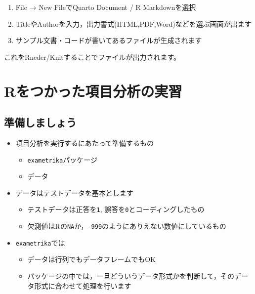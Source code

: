 \documentclass[
  a4paper,
]{ltjsbook}
\providecommand{\tightlist}{%
  \setlength{\itemsep}{0pt}\setlength{\parskip}{0pt}}\usepackage{longtable,booktabs,array}
\begin{document}
\begin{enumerate}
\def\labelenumi{\arabic{enumi}.}
\tightlist
\item
  File → New FileでQuarto Document / R Markdownを選択
\item
  TitleやAuthorを入力，出力書式(HTML,PDF,Word)などを選ぶ画面が出ます
\item
  サンプル文書・コードが書いてあるファイルが生成されます
\end{enumerate}

これをRneder/Knitすることでファイルが出力されます。


\chapter{Rをつかった項目分析の実習}\label{rux3092ux3064ux304bux3063ux305fux9805ux76eeux5206ux6790ux306eux5b9fux7fd2}

\section{準備しましょう}\label{ux6e96ux5099ux3057ux307eux3057ux3087ux3046}

\begin{itemize}
\tightlist
\item
  項目分析を実行するにあたって準備するもの

  \begin{itemize}
  \tightlist
  \item
    \texttt{exametrika}パッケージ
  \item
    データ
  \end{itemize}
\item
  データはテストデータを基本とします

  \begin{itemize}
  \tightlist
  \item
    テストデータは正答を\texttt{1},
    誤答を\texttt{0}とコーディングしたもの
  \item
    欠測値はRの\texttt{NA}か，\texttt{-999}のようにありえない数値にしているもの
  \end{itemize}
\item
  \texttt{exametrika}では

  \begin{itemize}
  \tightlist
  \item
    データは行列でもデータフレームでもOK
  \item
    パッケージの中では，一旦どういうデータ形式かを判断して，そのデータ形式に合わせて処理を行います
  \end{itemize}
\end{itemize}
\end{document}
